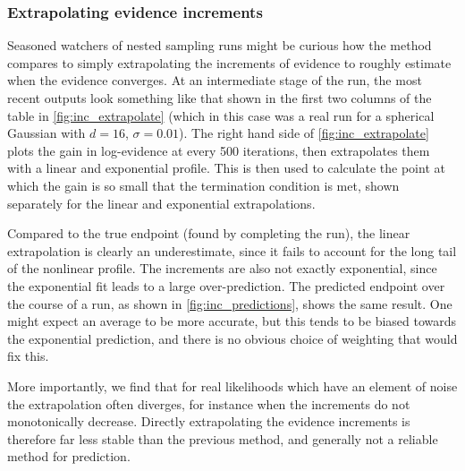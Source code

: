 \documentclass[usenatbib]{mnras}
\begin{document}
\subsubsection{Extrapolating evidence increments}
Seasoned watchers of nested sampling runs might be curious how the method compares to simply extrapolating the increments of evidence to roughly estimate when the evidence converges. At an intermediate stage of the run, the most recent outputs look something like that shown in the first two columns of the table in \cref{fig:inc_extrapolate} (which in this case was a real run for a spherical Gaussian with $d = 16$, $\sigma = 0.01$). The right hand side of \cref{fig:inc_extrapolate} plots the gain in log-evidence at every 500 iterations, then extrapolates them with a linear and exponential profile. This is then used to calculate the point at which the gain is so small that the termination condition is met, shown separately for the linear and exponential extrapolations.
\par
Compared to the true endpoint (found by completing the run), the linear extrapolation is clearly an underestimate, since it fails to account for the long tail of the nonlinear profile. The increments are also not exactly exponential, since the exponential fit leads to a large over-prediction. The predicted endpoint over the course of a run, as shown in \cref{fig:inc_predictions}, shows the same result. One might expect an average to be more accurate, but this tends to be biased towards the exponential prediction, and there is no obvious choice of weighting that would fix this.
\par
More importantly, we find that for real likelihoods which have an element of noise the extrapolation often diverges, for instance when the increments do not monotonically decrease. Directly extrapolating the evidence increments is therefore far less stable than the previous method, and generally not a reliable method for prediction.
\end{document}

